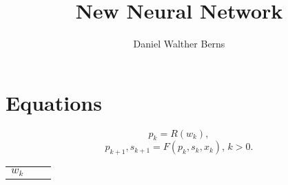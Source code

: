\documentclass[10pt,a4paper]{article}
\author{Daniel Walther Berns}
\title{New Neural Network}
\begin{document}
	\section{Equations}
	
	\begin{equation}
		p_{k} = R(w_{k}),
	\end{equation}
	\begin{equation}
	    p_{k+1}, s_{k+1} = F(p_{k}, s_{k}, x_{k}), \, k > 0.
    \end{equation}

    \begin{tabular}{ccc}
    	$w_{k}$ &  
    \end{tabular}
\end{document}
